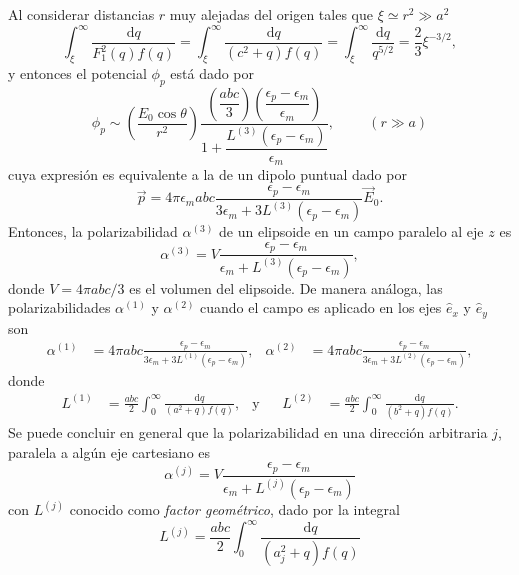 Al considerar distancias $r$ muy alejadas del origen tales que $\xi\simeq r^2\gg a^2$
\begin{equation*}
    \int_{\xi}^{\infty}\frac{\text{d}q}{F_1^2(q)f(q)}= \int_{\xi}^{\infty}\frac{\text{d}q}{(c^2+q)f(q)}=\int_{\xi}^{\infty}\frac{\text{d}q}{q^{5/2}}=\frac{2}{3}\xi^{-3/2},
\end{equation*}
y entonces el potencial $\phi_p$ está dado por
\begin{equation}
    \phi_p\sim\left(\dfrac{E_0\cos\theta}{r^2}\right)\dfrac{\left(\dfrac{abc}{3}\right)\left(\dfrac{\epsilon_p-\epsilon_m}{\epsilon_m}\right)}{1+\dfrac{L^{(3)}(\epsilon_p-\epsilon_m)}{\epsilon_m}},\hspace{1cm}(r\gg a)
\end{equation}
cuya expresión es equivalente a la de un dipolo puntual dado por
\begin{equation}
    \Vec{p}=4\pi\epsilon_m abc\frac{\epsilon_p-\epsilon_m}{3\epsilon_m+3L^{(3)}(\epsilon_p-\epsilon_m)}\Vec{E}_0
    \label{momento_dip}.
\end{equation}
Entonces, la polarizabilidad $\alpha^{(3)}$ de un elipsoide en un campo paralelo al eje $z$ es
\begin{equation}
    \alpha^{(3)}=V\frac{\epsilon_p-\epsilon_m}{\epsilon_m+L^{(3)}(\epsilon_p-\epsilon_m)},
\end{equation}
donde $V=4\pi abc/3$ es el volumen del elipsoide. De manera análoga, las polarizabilidades $ \alpha^{(1)}$ y $ \alpha^{(2)}$ cuando el campo es aplicado en los ejes $\hat{e}_x$ y $\hat{e}_y$ son
\begin{align*}
    \alpha^{(1)}&=4\pi abc \frac{\epsilon_p-\epsilon_m}{3\epsilon_m+3L^{(1)}(\epsilon_p-\epsilon_m)},&
    \alpha^{(2)}&=4\pi abc \frac{\epsilon_p-\epsilon_m}{3\epsilon_m+3L^{(2)}(\epsilon_p-\epsilon_m)},
\end{align*}
donde 
\begin{align*}
    L^{(1)}&=\frac{abc}{2}\int_{0}^{\infty}\frac{\text{d}q}{(a^2+q)f(q)},&\text{y} && 
    L^{(2)}&=\frac{abc}{2}\int_{0}^{\infty}\frac{\text{d}q}{(b^2+q)f(q)}.
\end{align*}
Se puede concluir en general que la polarizabilidad en una dirección arbitraria $j$, paralela a algún eje cartesiano es
\begin{equation}
    \alpha^{(j)}=V\frac{\epsilon_p-\epsilon_m}{\epsilon_m+L^{(j)}(\epsilon_p-\epsilon_m)}
\end{equation}
con $L^{(j)}$ conocido como \textit{factor geométrico}, dado por la integral 
\begin{equation}
    L^{(j)}=\frac{abc}{2}\int_0^{\infty}\frac{\text{d}q}{(a_j^2+q)f(q)}
\end{equation}
